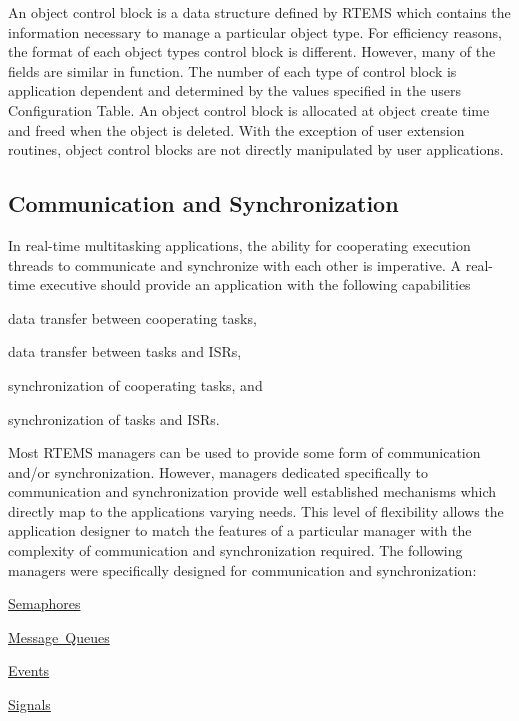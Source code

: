An object control block is a data structure defined by R\+T\+E\+MS which contains the information necessary to manage a particular object type. For efficiency reasons, the format of each object type\textquotesingle{}s control block is different. However, many of the fields are similar in function. The number of each type of control block is application dependent and determined by the values specified in the user\textquotesingle{}s Configuration Table. An object control block is allocated at object create time and freed when the object is deleted. With the exception of user extension routines, object control blocks are not directly manipulated by user applications.\hypertarget{group__RTEMSAPIClassic_ClassicRTEMSSecComSync}{}\subsection{Communication and Synchronization}\label{group__RTEMSAPIClassic_ClassicRTEMSSecComSync}
In real-\/time multitasking applications, the ability for cooperating execution threads to communicate and synchronize with each other is imperative. A real-\/time executive should provide an application with the following capabilities


\begin{DoxyItemize}
\item data transfer between cooperating tasks,
\item data transfer between tasks and I\+S\+Rs,
\item synchronization of cooperating tasks, and
\item synchronization of tasks and I\+S\+Rs.
\end{DoxyItemize}

Most R\+T\+E\+MS managers can be used to provide some form of communication and/or synchronization. However, managers dedicated specifically to communication and synchronization provide well established mechanisms which directly map to the application\textquotesingle{}s varying needs. This level of flexibility allows the application designer to match the features of a particular manager with the complexity of communication and synchronization required. The following managers were specifically designed for communication and synchronization\+:


\begin{DoxyItemize}
\item \mbox{\hyperlink{group__ClassicSem}{Semaphores}}
\item \mbox{\hyperlink{group__ClassicMessageQueue}{Message Queues}}
\item \mbox{\hyperlink{group__ClassicEvent}{Events}}
\item \mbox{\hyperlink{group__ClassicSignal}{Signals}}
\end{DoxyItemize}

